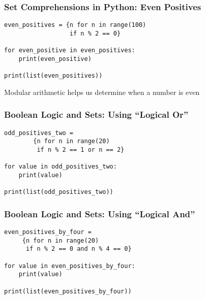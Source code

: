 \documentclass[14pt,aspectratio=169]{beamer}
\begin{document}
%
\begin{frame}[fragile]
  \frametitle{Set Comprehensions in Python: Even Positives}
  \normalsize
  \begin{minipage}{6in}
    \vspace*{.25in}
    \begin{verbatim}
even_positives = {n for n in range(100)
                  if n % 2 == 0}

for even_positive in even_positives:
    print(even_positive)

print(list(even_positives))
    \end{verbatim}
  \end{minipage}
  \vspace*{.05in}
  \begin{center}
    \normalsize \noindent Modular arithmetic helps us determine when a number is
    even\\
  \end{center}
\end{frame}

%
\begin{frame}[fragile]
  \frametitle{Boolean Logic and Sets: Using ``Logical Or''}
  \normalsize
  \begin{minipage}{6in}
    \vspace*{.25in}
    \begin{verbatim}
odd_positives_two =
        {n for n in range(20)
         if n % 2 == 1 or n == 2}

for value in odd_positives_two:
    print(value)

print(list(odd_positives_two))
    \end{verbatim}
  \end{minipage}
\end{frame}

%
\begin{frame}[fragile]
  \frametitle{Boolean Logic and Sets: Using ``Logical And''}
  \normalsize
  \begin{minipage}{6in}
    \vspace*{.25in}
    \begin{verbatim}
even_positives_by_four =
     {n for n in range(20)
      if n % 2 == 0 and n % 4 == 0}

for value in even_positives_by_four:
    print(value)

print(list(even_positives_by_four))
    \end{verbatim}
  \end{minipage}
\end{frame}
\end{document}

